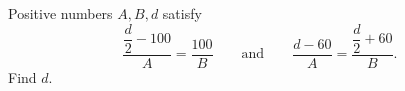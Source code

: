 Positive numbers $A,B,d$ satisfy
\[\dfrac{\dfrac d2-100}{A}=\dfrac{100}{B}\qquad\text{and}\qquad\dfrac{d-60}{A}=\dfrac{\dfrac d2+60}{B}.\]
Find $d$.
